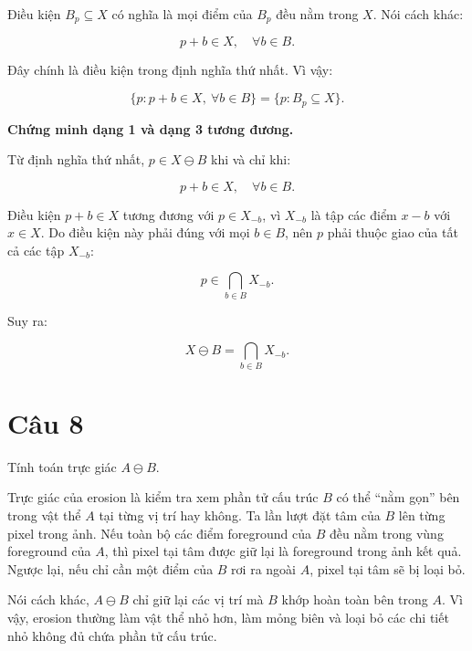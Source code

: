 Điều kiện $B_p\subseteq X$ có nghĩa là mọi điểm của $B_p$ đều nằm trong $X$. Nói cách khác:

\begin{equation}
    p+b\in X,\quad \forall b\in B.
\end{equation}

Đây chính là điều kiện trong định nghĩa thứ nhất. Vì vậy:

\begin{equation}
    \{p:p+b\in X,\ \forall b\in B\}=\{p:B_p\subseteq X\}.
\end{equation}

\textbf{Chứng minh dạng 1 và dạng 3 tương đương.}

Từ định nghĩa thứ nhất, $p\in X\ominus B$ khi và chỉ khi:

\begin{equation}
    p+b\in X,\quad \forall b\in B.
\end{equation}

Điều kiện $p+b\in X$ tương đương với $p\in X_{-b}$, vì $X_{-b}$ là tập các điểm $x-b$ với $x\in X$. Do điều kiện này phải đúng với mọi $b\in B$, nên $p$ phải thuộc giao của tất cả các tập $X_{-b}$:

\begin{equation}
    p\in \bigcap_{b\in B} X_{-b}.
\end{equation}

Suy ra:

\begin{equation}
    X\ominus B=\bigcap_{b\in B}X_{-b}.
\end{equation}

\section*{Câu 8}
Tính toán trực giác $A \ominus B$.

Trực giác của erosion là kiểm tra xem phần tử cấu trúc $B$ có thể ``nằm gọn'' bên trong vật thể $A$ tại từng vị trí hay không. Ta lần lượt đặt tâm của $B$ lên từng pixel trong ảnh. Nếu toàn bộ các điểm foreground của $B$ đều nằm trong vùng foreground của $A$, thì pixel tại tâm được giữ lại là foreground trong ảnh kết quả. Ngược lại, nếu chỉ cần một điểm của $B$ rơi ra ngoài $A$, pixel tại tâm sẽ bị loại bỏ.

Nói cách khác, $A \ominus B$ chỉ giữ lại các vị trí mà $B$ khớp hoàn toàn bên trong $A$. Vì vậy, erosion thường làm vật thể nhỏ hơn, làm mỏng biên và loại bỏ các chi tiết nhỏ không đủ chứa phần tử cấu trúc.

